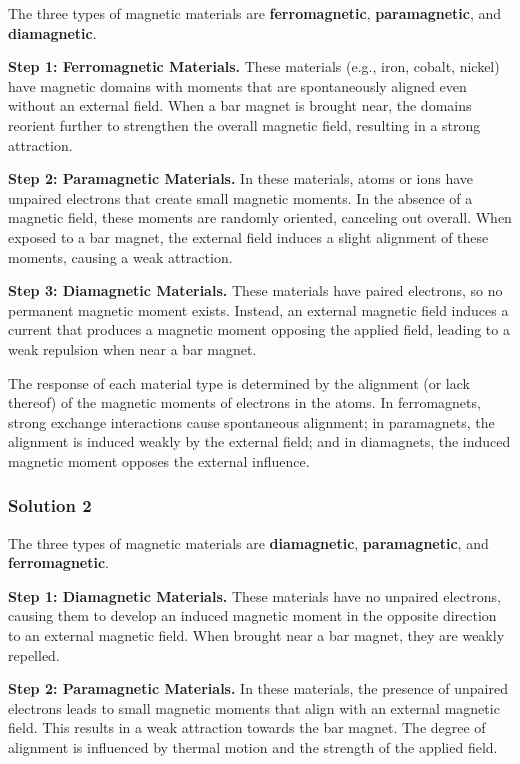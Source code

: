 \documentclass{article}
\begin{document}
The three types of magnetic materials are \textbf{ferromagnetic}, \textbf{paramagnetic}, and \textbf{diamagnetic}. 

\textbf{Step 1: Ferromagnetic Materials.} These materials (e.g., iron, cobalt, nickel) have magnetic domains with moments that are spontaneously aligned even without an external field. When a bar magnet is brought near, the domains reorient further to strengthen the overall magnetic field, resulting in a strong attraction.

\textbf{Step 2: Paramagnetic Materials.} In these materials, atoms or ions have unpaired electrons that create small magnetic moments. In the absence of a magnetic field, these moments are randomly oriented, canceling out overall. When exposed to a bar magnet, the external field induces a slight alignment of these moments, causing a weak attraction.

\textbf{Step 3: Diamagnetic Materials.} These materials have paired electrons, so no permanent magnetic moment exists. Instead, an external magnetic field induces a current that produces a magnetic moment opposing the applied field, leading to a weak repulsion when near a bar magnet.

The response of each material type is determined by the alignment (or lack thereof) of the magnetic moments of electrons in the atoms. In ferromagnets, strong exchange interactions cause spontaneous alignment; in paramagnets, the alignment is induced weakly by the external field; and in diamagnets, the induced magnetic moment opposes the external influence.

\subsubsection{Solution 2}

The three types of magnetic materials are \textbf{diamagnetic}, \textbf{paramagnetic}, and \textbf{ferromagnetic}. 

\textbf{Step 1: Diamagnetic Materials.} These materials have no unpaired electrons, causing them to develop an induced magnetic moment in the opposite direction to an external magnetic field. When brought near a bar magnet, they are weakly repelled. 

\textbf{Step 2: Paramagnetic Materials.} In these materials, the presence of unpaired electrons leads to small magnetic moments that align with an external magnetic field. This results in a weak attraction towards the bar magnet. The degree of alignment is influenced by thermal motion and the strength of the applied field.
\end{document}
